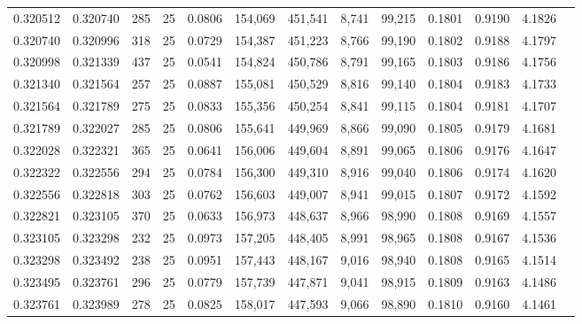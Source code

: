 \begin{tabular}{rrrrrrrrrrrrr}
0.320512 & 0.320740 &   285 &  25 &                                     0.0806 & 154,069 & 451,541 &   8,741 &  99,215 & 0.1801 & 0.9190 & 4.1826 \\
0.320740 & 0.320996 &   318 &  25 &                                     0.0729 & 154,387 & 451,223 &   8,766 &  99,190 & 0.1802 & 0.9188 & 4.1797 \\
0.320998 & 0.321339 &   437 &  25 &                                     0.0541 & 154,824 & 450,786 &   8,791 &  99,165 & 0.1803 & 0.9186 & 4.1756 \\
0.321340 & 0.321564 &   257 &  25 &                                     0.0887 & 155,081 & 450,529 &   8,816 &  99,140 & 0.1804 & 0.9183 & 4.1733 \\
0.321564 & 0.321789 &   275 &  25 &                                     0.0833 & 155,356 & 450,254 &   8,841 &  99,115 & 0.1804 & 0.9181 & 4.1707 \\
0.321789 & 0.322027 &   285 &  25 &                                     0.0806 & 155,641 & 449,969 &   8,866 &  99,090 & 0.1805 & 0.9179 & 4.1681 \\
0.322028 & 0.322321 &   365 &  25 &                                     0.0641 & 156,006 & 449,604 &   8,891 &  99,065 & 0.1806 & 0.9176 & 4.1647 \\
0.322322 & 0.322556 &   294 &  25 &                                     0.0784 & 156,300 & 449,310 &   8,916 &  99,040 & 0.1806 & 0.9174 & 4.1620 \\
0.322556 & 0.322818 &   303 &  25 &                                     0.0762 & 156,603 & 449,007 &   8,941 &  99,015 & 0.1807 & 0.9172 & 4.1592 \\
0.322821 & 0.323105 &   370 &  25 &                                     0.0633 & 156,973 & 448,637 &   8,966 &  98,990 & 0.1808 & 0.9169 & 4.1557 \\
0.323105 & 0.323298 &   232 &  25 &                                     0.0973 & 157,205 & 448,405 &   8,991 &  98,965 & 0.1808 & 0.9167 & 4.1536 \\
0.323298 & 0.323492 &   238 &  25 &                                     0.0951 & 157,443 & 448,167 &   9,016 &  98,940 & 0.1808 & 0.9165 & 4.1514 \\
0.323495 & 0.323761 &   296 &  25 &                                     0.0779 & 157,739 & 447,871 &   9,041 &  98,915 & 0.1809 & 0.9163 & 4.1486 \\
0.323761 & 0.323989 &   278 &  25 &                                     0.0825 & 158,017 & 447,593 &   9,066 &  98,890 & 0.1810 & 0.9160 & 4.1461 \\

\end{tabular}
